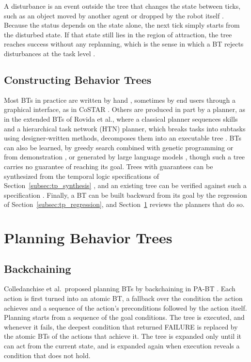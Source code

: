     A disturbance is an event outside the tree that changes the state between ticks, such as an object moved by another agent or dropped by the robot itself \cite{ogren2020}.
    Because the status depends on the state alone, the next tick simply starts from the disturbed state.
    If that state still lies in the region of attraction, the tree reaches success without any replanning, which is the sense in which a BT rejects disturbances at the task level \cite{ogren2020}.

    \subsection{Constructing Behavior Trees}
    \label{subsec:bt_construction}
    Most BTs in practice are written by hand \cite{iovino2022}, sometimes by end users through a graphical interface, as in CoSTAR \cite{paxton2017}.
    Others are produced in part by a planner, as in the extended BTs of Rovida et al., where a classical planner sequences skills and a hierarchical task network (HTN) planner, which breaks tasks into subtasks using designer-written methods, decomposes them into an executable tree \cite{rovida2017}.
    BTs can also be learned, by greedy search combined with genetic programming \cite{colledanchise2019learning} or from demonstration \cite{colledanchise2018book}, or generated by large language models \cite{ao2025, izzo2024btgenbot}, though such a tree carries no guarantee of reaching its goal.
    Trees with guarantees can be synthesized from the temporal logic specifications of Section~\ref{subsec:tp_synthesis} \cite{colledanchise2017synthesis, wu2025effbt}, and an existing tree can be verified against such a specification \cite{biggar2020}.
    Finally, a BT can be built backward from its goal by the regression of Section~\ref{subsec:tp_regression}, and Section~\ref{sec:bt_planning} reviews the planners that do so.
    
\section{Planning Behavior Trees}
\label{sec:bt_planning}
    \subsection{Backchaining}
    \label{subsec:rw_backchaining}
    Colledanchise et al.\ proposed planning BTs by backchaining in PA-BT \cite{colledanchise2019pabt, colledanchise2018book}.
    Each action is first turned into an atomic BT, a fallback over the condition the action achieves and a sequence of the action's preconditions followed by the action itself.
    Planning starts from a sequence of the goal conditions.
    The tree is executed, and whenever it fails, the deepest condition that returned FAILURE is replaced by the atomic BTs of the actions that achieve it.
    The tree is expanded only until it can act from the current state, and is expanded again when execution reveals a condition that does not hold.

